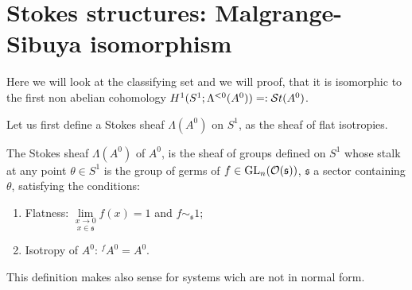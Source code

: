 \section{Stokes structures: Malgrange-Sibuya isomorphism}
\begin{comment}
  \cite[Thm.I.2.1]{Loday1994}, \cite[Thm.4.3.9]{Loday2014} and
  \cite[Thm.II.6.2]{sabbah2007isomonodromic}
\end{comment}
Here we will look at the classifying set and we will proof, that it is
isomorphic \TODO[as\dots] to the first non abelian cohomology 
$H^1(S^1;\Lambda^{<0}(A^0))=:\mathcal{S}{}t(A^0)$.

Let us first define a Stokes sheaf $\Lambda(A^0)$ on $S^1$, as the sheaf of
flat isotropies.
\begin{defn} \label{defn:StokesSheaf}
  The Stokes sheaf $\Lambda(A^0)$ of $A^0$, is the sheaf of groups defined on
  $S^1$ whose stalk at any point $\theta\in S^1$ is the group of germs of
  $f\in\operatorname{GL}_n(\mathcal{O}(\mathfrak{s}))$, $\mathfrak{s}$ a sector containing $\theta$, satisfying
  the conditions:
  \begin{enumerate}
    \item Flatness: $\underset{x\in\mathfrak{s}}{\underset{x\to0}{\lim}}f(x)=1$
      and $f\sim_{\mathfrak{s}} 1$;
    \item Isotropy of $A^0$: ${}^f\!A^0=A^0$.
  \end{enumerate}
  \begin{s-rem}
    This definition makes also sense for systems wich are not in normal form.
  \end{s-rem}
  \begin{comment}
    \begin{s-rem}
      $\Lambda(A^0)$ is the same as $\Aut^{<0}(\tilde\cM^{nf})$
      in~\cite{sabbah2007isomonodromic} which is defined as follows \TODO
    \end{s-rem}
  \end{comment}
\end{defn}

